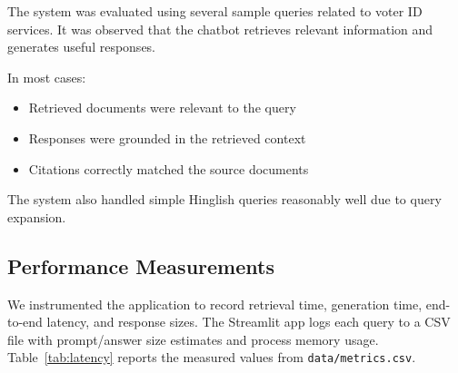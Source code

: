 \documentclass[11pt,a4paper]{article}
\begin{document}
The system was evaluated using several sample queries related to voter ID services. It was observed that the chatbot retrieves relevant information and generates useful responses.

In most cases:
\begin{itemize}
    \item Retrieved documents were relevant to the query
    \item Responses were grounded in the retrieved context
    \item Citations correctly matched the source documents
\end{itemize}

The system also handled simple Hinglish queries reasonably well due to query expansion.

\subsection{Performance Measurements}

We instrumented the application to record retrieval time, generation time, end-to-end latency, and response sizes. The Streamlit app logs each query to a CSV file with prompt/answer size estimates and process memory usage. Table~\ref{tab:latency} reports the measured values from \texttt{data/metrics.csv}.

\begin{table}[H]
\centering
\scriptsize
\setlength{\tabcolsep}{3pt}
\renewcommand{\arraystretch}{1.05}
\caption{Latency and resource measurements collected from the deployed app.}
\label{tab:latency}
\end{table}
\end{document}

